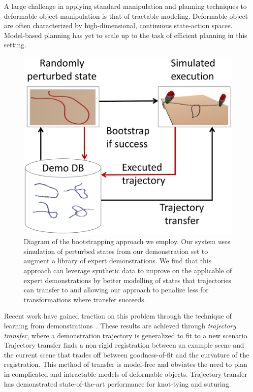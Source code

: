 A large challenge in applying standard manipulation and planning techniques to
deformable object manipulation is that of tractable modeling. Deformable object 
are often characterized by high-dimensional, continuous state-action spaces. Model-based planning has yet to scale up to the task of efficient planning in this
setting.

\begin{figure}[t]
  \includegraphics[width=\linewidth]{figs/teaser.png}
  \caption{Diagram of the bootstrapping approach we employ. Our system uses simulation of perturbed states from our demonstration set to augment a library of expert demonstrations. We find that this approach can leverage synthetic data to improve on the applicable of expert demonstrations by better modelling of states that trajectories can transfer to and allowing our approach to penalize less for transformations where transfer succeeds.}
\label{fig:bootstrap}
\end{figure}

Recent work have gained traction on this problem through the technique of 
learning from demonstrations~\cite{Schulmanetal_ISRR2013,Schulmanetal_IROS2013}.
These results are achieved through \emph{trajectory transfer}, where a demonstration
trajectory is generalized to fit to a new scenario. Trajectory transfer finds a non-rigid registration between an example scene and the current scene that trades off between goodness-of-fit and the curvature of the registration. 
This method of transfer is model-free and obviates the need to plan in complicated
and intractable models of deformable objects. Trajectory transfer has demonstrated 
state-of-the-art performance for knot-tying and suturing.

